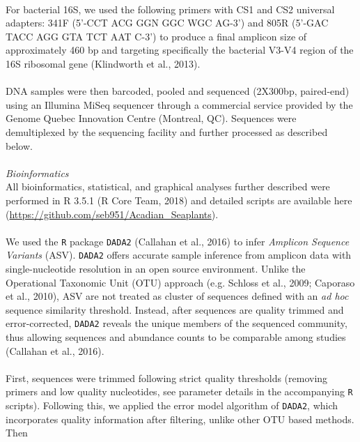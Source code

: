 \documentclass[12pt,]{article}
\begin{document}
\hspace*{0.333em}\\
For bacterial 16S, we used the following primers with CS1 and CS2
universal adapters: 341F (5'-CCT ACG GGN GGC WGC AG-3') and 805R (5'-GAC
TACC AGG GTA TCT AAT C-3') to produce a final amplicon size of
approximately 460 bp and targeting specifically the bacterial V3-V4
region of the 16S ribosomal gene (Klindworth et al., 2013).\\
\hspace*{0.333em}\\
DNA samples were then barcoded, pooled and sequenced (2X300bp,
paired-end) using an Illumina MiSeq sequencer through a commercial
service provided by the Genome Quebec Innovation Centre (Montreal, QC).
Sequences were demultiplexed by the sequencing facility and further
processed as described below.\\
\hspace*{0.333em}\\
\emph{Bioinformatics}\\
All bioinformatics, statistical, and graphical analyses further
described were performed in R 3.5.1 (R Core Team, 2018) and detailed
scripts are available here
(\url{https://github.com/seb951/Acadian_Seaplants}).\\
\hspace*{0.333em}\\
We used the \texttt{R} package \texttt{DADA2} (Callahan et al., 2016) to
infer \emph{Amplicon Sequence Variants} (ASV). \texttt{DADA2} offers
accurate sample inference from amplicon data with single-nucleotide
resolution in an open source environment. Unlike the Operational
Taxonomic Unit (OTU) approach (e.g. Schloss et al., 2009; Caporaso et
al., 2010), ASV are not treated as cluster of sequences defined with an
\emph{ad hoc} sequence similarity threshold. Instead, after sequences
are quality trimmed and error-corrected, \texttt{DADA2} reveals the
unique members of the sequenced community, thus allowing sequences and
abundance counts to be comparable among studies (Callahan et al.,
2016).\\
\hspace*{0.333em}\\
First, sequences were trimmed following strict quality thresholds
(removing primers and low quality nucleotides, see parameter details in
the accompanying \texttt{R} scripts). Following this, we applied the
error model algorithm of \texttt{DADA2}, which incorporates quality
information after filtering, unlike other OTU based methods. Then
\end{document}
